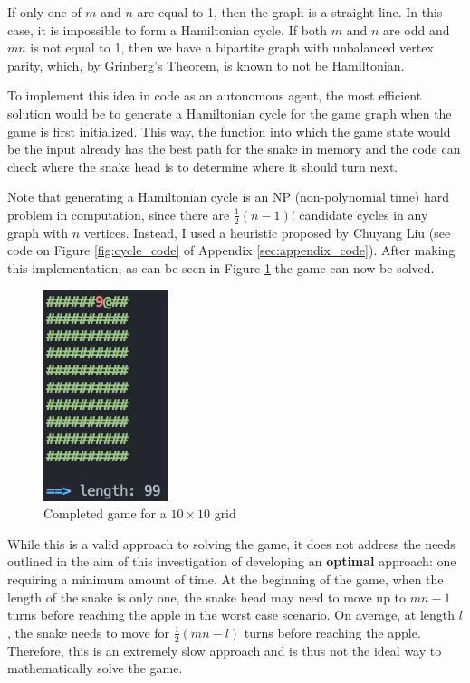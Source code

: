 \documentclass[12pt]{article}
\begin{document}
If only one of $m$ and $n$ are equal to 1, then the graph is a straight line. In this case, it is impossible to form a Hamiltonian cycle. If both $m$ and $n$ are odd and $mn$ is not equal to 1, then we have a bipartite graph with unbalanced vertex parity, which, by Grinberg's Theorem, is known to not be Hamiltonian.

To implement this idea in code as an autonomous agent, the most efficient solution would be to generate a Hamiltonian cycle for the game graph when the game is first initialized. This way, the function into which the game state would be the input already has the best path for the snake in memory and the code can check where the snake head is to determine where it should turn next.

Note that generating a Hamiltonian cycle is an NP (non-polynomial time) hard problem in computation, since there are $\frac{1}{2} (n-1)!$ candidate cycles in any graph with $n$ vertices. Instead, I used a heuristic proposed by Chuyang Liu (see code on Figure \ref{fig:cycle_code} of Appendix \ref{sec:appendix_code}). After making this implementation, as can be seen in Figure \ref{fig:finished_cycle} the game can now be solved.

\begin{figure}[!h]
\centering
	\includegraphics[scale=0.6]{finished_cycle.png}
	\caption{Completed game for a $10 \times 10$ grid}
	\label{fig:finished_cycle}
\end{figure}

While this is a valid approach to solving the game, it does not address the needs outlined in the aim of this investigation of developing an \textbf{optimal} approach: one requiring a minimum amount of time. At the beginning of the game, when the length of the snake is only one, the snake head may need to move up to $mn - 1$ turns before reaching the apple in the worst case scenario. On average, at length $l$, the snake needs to move for $\frac{1}{2} (mn-l)$ turns before reaching the apple. Therefore, this is an extremely slow approach and is thus not the ideal way to mathematically solve the game.
\end{document}
